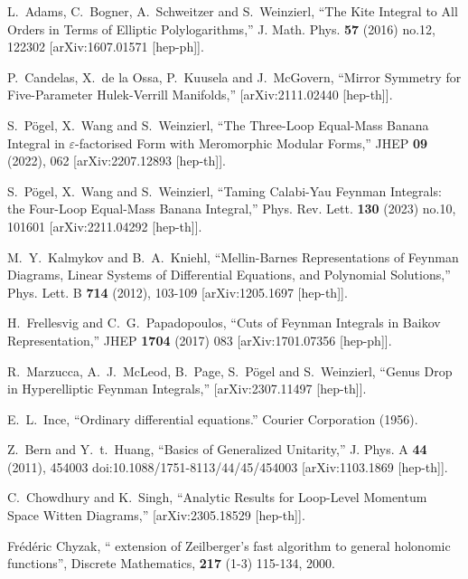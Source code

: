 \documentclass[a4paper,12pt]{article}
\numberwithin{equation}{section}
\numberwithin{figure}{section}
\begin{document}
\begin{thebibliography}{99}
L.~Adams, C.~Bogner, A.~Schweitzer and S.~Weinzierl,
``The Kite Integral to All Orders in Terms of Elliptic Polylogarithms,''
J. Math. Phys. \textbf{57} (2016) no.12, 122302
[arXiv:1607.01571 [hep-ph]].

P.~Candelas, X.~de la Ossa, P.~Kuusela and J.~McGovern,
``Mirror Symmetry for Five-Parameter Hulek-Verrill Manifolds,''
[arXiv:2111.02440 [hep-th]].

S.~P\"ogel, X.~Wang and S.~Weinzierl,
``The Three-Loop Equal-Mass Banana Integral in \ensuremath{\varepsilon}-factorised Form with Meromorphic Modular Forms,''
JHEP \textbf{09} (2022), 062
[arXiv:2207.12893 [hep-th]].


S.~P\"ogel, X.~Wang and S.~Weinzierl,
``Taming Calabi-Yau Feynman Integrals: the Four-Loop Equal-Mass Banana Integral,''
Phys. Rev. Lett. \textbf{130} (2023) no.10, 101601
[arXiv:2211.04292 [hep-th]].


M.~Y.~Kalmykov and B.~A.~Kniehl,
``Mellin-Barnes Representations of Feynman Diagrams, Linear Systems of Differential Equations, and Polynomial Solutions,''
Phys. Lett. B \textbf{714} (2012), 103-109
[arXiv:1205.1697 [hep-th]].
  
  H.~Frellesvig and C.~G.~Papadopoulos,
  ``Cuts of Feynman Integrals in Baikov Representation,''
  JHEP {\bf 1704} (2017) 083
  [arXiv:1701.07356 [hep-ph]].
  
R.~Marzucca, A.~J.~McLeod, B.~Page, S.~P\"ogel and S.~Weinzierl,
``Genus Drop in Hyperelliptic Feynman Integrals,''
[arXiv:2307.11497 [hep-th]].

 E.~L.~Ince, ``Ordinary differential equations.''
  Courier Corporation  (1956).
 

  
Z.~Bern and Y.~t.~Huang,
``Basics of Generalized Unitarity,''
J. Phys. A \textbf{44} (2011), 454003
doi:10.1088/1751-8113/44/45/454003
[arXiv:1103.1869 [hep-th]].



C.~Chowdhury and K.~Singh,
``Analytic Results for Loop-Level Momentum Space Witten Diagrams,''
[arXiv:2305.18529 [hep-th]].

  Fr\'ed\'eric Chyzak, `` extension of
    Zeilberger's fast algorithm to general holonomic functions'',
Discrete Mathematics, {\bf 217} (1-3) 115-134, 2000.


\end{thebibliography}
\end{document}
